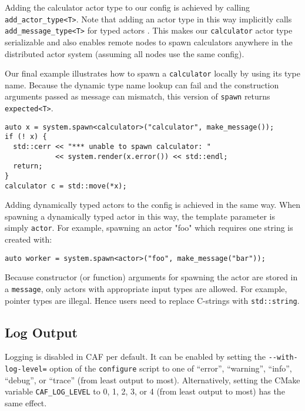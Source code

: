 
Adding the calculator actor type to our config is achieved by calling
\lstinline^add_actor_type<T>^. Note that adding an actor type in this way
implicitly calls \lstinline^add_message_type<T>^ for typed actors
. This makes our \lstinline^calculator^ actor type
serializable and also enables remote nodes to spawn calculators anywhere in the
distributed actor system (assuming all nodes use the same config).


Our final example illustrates how to spawn a \lstinline^calculator^ locally by
using its type name. Because the dynamic type name lookup can fail and the
construction arguments passed as message can mismatch, this version of
\lstinline^spawn^ returns \lstinline^expected<T>^.

\begin{lstlisting}
auto x = system.spawn<calculator>("calculator", make_message());
if (! x) {
  std::cerr << "*** unable to spawn calculator: "
            << system.render(x.error()) << std::endl;
  return;
}
calculator c = std::move(*x);
\end{lstlisting}

Adding dynamically typed actors to the config is achieved in the same way. When
spawning a dynamically typed actor in this way, the template parameter is
simply \lstinline^actor^. For example, spawning an actor "foo" which requires
one string is created with:

\begin{lstlisting}
auto worker = system.spawn<actor>("foo", make_message("bar"));
\end{lstlisting}

Because constructor (or function) arguments for spawning the actor are stored
in a \lstinline^message^, only actors with appropriate input types are allowed.
For example, pointer types are illegal. Hence users need to replace C-strings
with \lstinline^std::string^.

\clearpage
\subsection{Log Output}
\label{log-output}

Logging is disabled in CAF per default. It can be enabled by setting the
\lstinline^--with-log-level=^ option of the \lstinline^configure^ script to one
of ``error'', ``warning'', ``info'', ``debug'', or ``trace'' (from least output
to most). Alternatively, setting the CMake variable \lstinline^CAF_LOG_LEVEL^
to 0, 1, 2, 3, or 4 (from least output to most) has the same effect.

